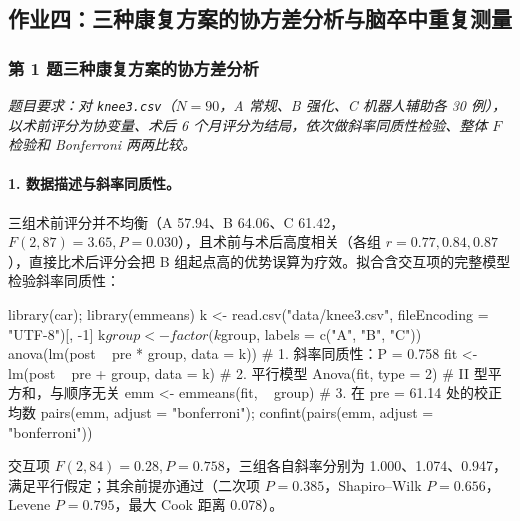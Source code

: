 \subsection{作业四：三种康复方案的协方差分析与脑卒中重复测量}

\subsubsection*{第 1 题\quad 三种康复方案的协方差分析}
\emph{题目要求：对 \texttt{knee3.csv}（$N=90$，A 常规、B 强化、C 机器人辅助各 30 例），以术前评分为协变量、术后 6 个月评分为结局，依次做斜率同质性检验、整体 $F$ 检验和 Bonferroni 两两比较。}

\paragraph{1. 数据描述与斜率同质性。}三组术前评分并不均衡（A 57.94、B 64.06、C 61.42，$F(2,87)=3.65,P=0.030$），且术前与术后高度相关（各组 $r=0.77,0.84,0.87$），直接比术后评分会把 B 组起点高的优势误算为疗效。拟合含交互项的完整模型检验斜率同质性：

\begin{RCode}
library(car); library(emmeans)
k <- read.csv("data/knee3.csv", fileEncoding = "UTF-8")[, -1]
k$group <- factor(k$group, labels = c("A", "B", "C"))
anova(lm(post ~ pre * group, data = k))          # 1. 斜率同质性：P = 0.758
fit <- lm(post ~ pre + group, data = k)          # 2. 平行模型
Anova(fit, type = 2)                             #    II 型平方和，与顺序无关
emm <- emmeans(fit, ~ group)                     # 3. 在 pre = 61.14 处的校正均数
pairs(emm, adjust = "bonferroni"); confint(pairs(emm, adjust = "bonferroni"))
\end{RCode}

交互项 $F(2,84)=0.28,P=0.758$，三组各自斜率分别为 1.000、1.074、0.947，满足平行假定；其余前提亦通过（二次项 $P=0.385$，Shapiro--Wilk $P=0.656$，Levene $P=0.795$，最大 Cook 距离 0.078）。

